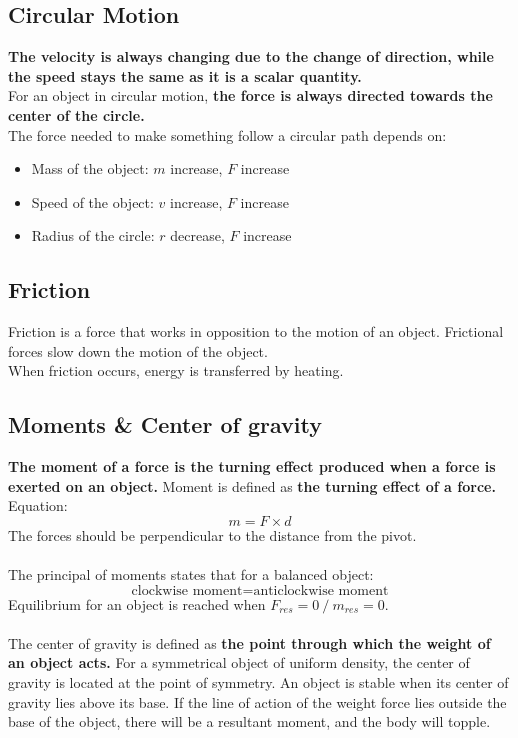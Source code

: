 \documentclass[a4paper,12pt]{article}
\begin{document}
\subsection{Circular Motion}
\textbf{The velocity is always changing due to the change of direction, while the speed stays the same as it is a scalar quantity.}\\
For an object in circular motion, \textbf{the force is always directed towards the center of the circle.}\\
The force needed to make something follow a circular path depends on:
\begin{itemize}
    \item Mass of the object: \(m\) increase, \(F\) increase
    \item Speed of the object: \(v\) increase, \(F\) increase
    \item Radius of the circle: \(r\) decrease, \(F\) increase
\end{itemize}
\subsection{Friction}
Friction is a force that works in opposition to the motion of an object. Frictional forces slow down the motion of the object.\\
When friction occurs, energy is transferred by heating.
\subsection{Moments \& Center of gravity}
\textbf{The moment of a force is the turning effect produced when a force is exerted on an object.} Moment is defined as \textbf{the turning effect of a force.}\\
Equation: \[m=F\times d\]
The forces should be perpendicular to the distance from the pivot. \\\\
The principal of moments states that for a balanced object:
\[\text{clockwise moment} = \text{anticlockwise moment}\]
Equilibrium for an object is reached when \(F_{res}=0 \ /\ m_{res}=0\).\\\\
The center of gravity is defined as \textbf{the point through which the weight of an object acts.}
For a symmetrical object of uniform density, the center of gravity is located at the point of symmetry. An object is stable when its center of gravity lies above its base. If the line of action of the weight force lies outside the base of the object, there will be a resultant moment, and the body will topple.
\end{document}

